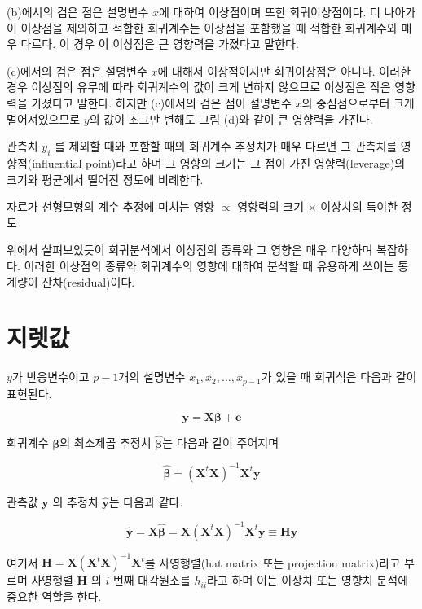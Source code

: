 \documentclass[
]{book}
\makeatletter
\newenvironment{kframe}{%
\medskip{}
\setlength{\fboxsep}{.8em}
 \def\at@end@of@kframe{}%
 \ifinner\ifhmode%
  \def\at@end@of@kframe{\end{minipage}}%
  \begin{minipage}{\columnwidth}%
 \fi\fi%
 \def\FrameCommand##1{\hskip\@totalleftmargin \hskip-\fboxsep
 \colorbox{shadecolor}{##1}\hskip-\fboxsep
     \hskip-\linewidth \hskip-\@totalleftmargin \hskip\columnwidth}%
 \MakeFramed {\advance\hsize-\width
   \@totalleftmargin\z@ \linewidth\hsize
   \@setminipage}}%
 {\par\unskip\endMakeFramed%
 \at@end@of@kframe}
\newenvironment{rmdblock}[1]
  {
  \begin{itemize}
  \renewcommand{\labelitemi}{
    \raisebox{-.7\height}[0pt][0pt]{
      {\setkeys{Gin}{width=3em,keepaspectratio}\texttt{[image: images/\#1]}}
    }
  }
  \setlength{\fboxsep}{1em}
  \begin{kframe}
  \item
  }
  {
  \end{kframe}
  \end{itemize}
  }
\newenvironment{rmdimportant}
  {\begin{rmdblock}{important}}
  {\end{rmdblock}}
\theoremstyle{definition}
\theoremstyle{definition}
\theoremstyle{definition}
\theoremstyle{definition}
\theoremstyle{remark}
\makeatother
\begin{document}
(b)에서의 검은 점은 설명변수 \(x\)에 대하여 이상점이며 또한
회귀이상점이다. 더 나아가 이 이상점을 제외하고 적합한 회귀계수는
이상점을 포함했을 때 적합한 회귀계수와 매우 다르다. 이 경우 이 이상점은
큰 영향력을 가졌다고 말한다.

(c)에서의 검은 점은 설명변수 \(x\)에 대해서 이상점이지만 회귀이상점은
아니다. 이러한 경우 이상점의 유무에 따라 회귀계수의 값이 크게 변하지
않으므로 이상점은 작은 영향력을 가졌다고 말한다. 하지만 (c)에서의 검은
점이 설명변수 \(x\)의 중심점으로부터 크게 멀어져있으므로 \(y\)의 값이 조그만
변해도 그림 (d)와 같이 큰 영향력을 가진다.

관측치 \(y_i\) 를 제외할 때와 포함할 때의 회귀계수 추정치가 매우 다르면 그
관측치를 영향점(influential point)라고 하며 그 영향의 크기는 그 점이
가진 영향력(leverage)의 크기와 평균에서 떨어진 정도에 비례한다.

\begin{rmdimportant}
자료가 선형모형의 계수 추정에 미치는 영향 \(\propto\) 영향력의 크기 \(\times\) 이상치의 특이한 정도
\end{rmdimportant}

위에서 살펴보았듯이 회귀분석에서 이상점의 종류와 그 영향은 매우 다양하며
복잡하다. 이러한 이상점의 종류와 회귀계수의 영향에 대하여 분석할 때
유용하게 쓰이는 통계량이 잔차(residual)이다.

\hypertarget{uxc9c0uxb81buxac12}{%
\section{지렛값}\label{uxc9c0uxb81buxac12}}

\(y\)가 반응변수이고 \(p-1\)개의 설명변수 \(x_1,x_2,\dots,x_{p-1}\)가 있을 때
회귀식은 다음과 같이 표현된다.

\[ \bm y = \bm X \bm \beta + \bm e \]

회귀계수 \(\bm \beta\)의 최소제곱 추정치 \(\hat{ \bm \beta}\)는 다음과 같이
주어지며

\[ \hat{ \bm \beta} = (\bm X^t \bm X)^{-1} \bm X^t \bm y \]

관측값 \(\bm y\) 의 추정치 \(\hat {\bm y}\)는 다음과 같다.

\[  \hat {\bm y} = \bm X \hat{ \bm \beta} =  \bm X (\bm X^t \bm X)^{-1} \bm X^t \bm y \equiv \bm H \bm y \]

여기서 \(\bm H= \bm X (\bm X^t \bm X)^{-1} \bm X^t\)를 사영행렬(hat matrix
또는 projection matrix)라고 부르며 사영행렬 \(\bm H\) 의 \(i\) 번째
대각원소를 \(h_{ii}\)라고 하며 이는 이상치 또는 영향치 분석에 중요한
역할을 한다.
\end{document}
